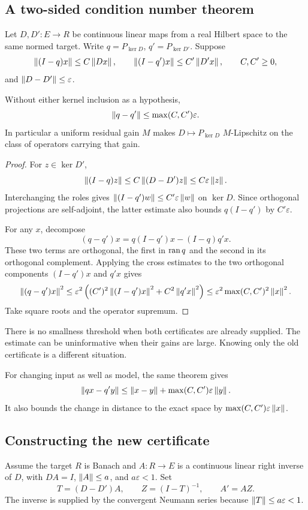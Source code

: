 \label{sec:motion}
\subsection{A two-sided condition number theorem}
Let \(D,D':E\to R\) be continuous linear maps from a real Hilbert space to the same normed target. Write \(q=P_{\ker D}\), \(q'=P_{\ker D'}\). Suppose
\[
 \left\lVert(I-q)x\right\rVert\le C\left\lVert Dx\right\rVert,\qquad
 \left\lVert(I-q')x\right\rVert\le C'\left\lVert D'x\right\rVert,\qquad C,C'\ge0,
\]
and \(\left\lVert D-D'\right\rVert\le\varepsilon\).

\begin{theorem}\label{KS48}
Without either kernel inclusion as a hypothesis,
\begin{equation}\label{eq:motion}
 \left\lVert q-q'\right\rVert\le\max(C,C')\varepsilon.
\end{equation}
In particular a uniform residual gain \(M\) makes \(D\mapsto P_{\ker D}\) \(M\)-Lipschitz on the class of operators carrying that gain.
\end{theorem}
\begin{proof}
For \(z\in\ker D'\),
\[
 \left\lVert(I-q)z\right\rVert\le C\left\lVert(D-D')z\right\rVert\le C\varepsilon\left\lVert z\right\rVert.
\]
Interchanging the roles gives \(\left\lVert(I-q')w\right\rVert\le C'\varepsilon\left\lVert w\right\rVert\) on \(\ker D\). Since orthogonal projections are self-adjoint, the latter estimate also bounds \(q(I-q')\) by \(C'\varepsilon\).

For any \(x\), decompose
\[
 (q-q')x=q(I-q')x-(I-q)q'x.
\]
These two terms are orthogonal, the first in \(\operatorname{ran} q\) and the second in its orthogonal complement. Applying the cross estimates to the two orthogonal components \((I-q')x\) and \(q'x\) gives
\[
 \left\lVert(q-q')x\right\rVert^2
 \le\varepsilon^2\left((C')^2\left\lVert(I-q')x\right\rVert^2+C^2\left\lVert q'x\right\rVert^2\right)
 \le\varepsilon^2\max(C,C')^2\left\lVert x\right\rVert^2.
\]
Take square roots and the operator supremum.
\end{proof}
There is no smallness threshold when both certificates are already supplied. The estimate can be uninformative when their gains are large. Knowing only the old certificate is a different situation.

For changing input as well as model, the same theorem gives
\[
 \left\lVert qx-q'y\right\rVert\le\left\lVert x-y\right\rVert+\max(C,C')\varepsilon\left\lVert y\right\rVert.
\]
It also bounds the change in distance to the exact space by \(\max(C,C')\varepsilon\left\lVert x\right\rVert\).

\subsection{Constructing the new certificate}
Assume the target \(R\) is Banach and \(A:R\to E\) is a continuous linear right inverse of \(D\), with \(DA=I\), \(\left\lVert A\right\rVert\le a\), and \(a\varepsilon<1\). Set
\[
 T=(D-D')A,\qquad Z=(I-T)^{-1},\qquad A'=AZ.
\]
The inverse is supplied by the convergent Neumann series because \(\left\lVert T\right\rVert\le a\varepsilon<1\).


